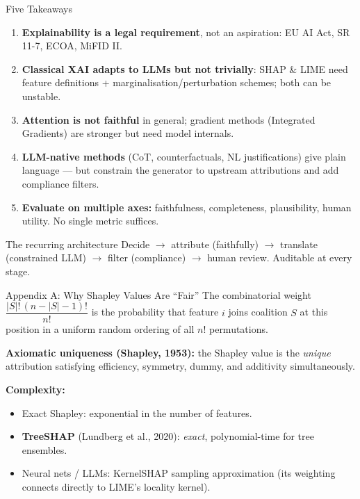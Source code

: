 \documentclass[9pt,t]{beamer}
\begin{document}
\begin{frame}{Five Takeaways}
\begin{enumerate}
  \item \textbf{Explainability is a legal requirement}, not an aspiration:
        EU AI Act, SR 11-7, ECOA, MiFID II.
  \item \textbf{Classical XAI adapts to LLMs but not trivially}: SHAP \& LIME
        need feature definitions + marginalisation/perturbation schemes; both can
        be unstable.
  \item \textbf{Attention is not faithful} in general; gradient methods
        (Integrated Gradients) are stronger but need model internals.
  \item \textbf{LLM-native methods} (CoT, counterfactuals, NL justifications) give
        plain language --- but constrain the generator to upstream attributions
        and add compliance filters.
  \item \textbf{Evaluate on multiple axes:} faithfulness, completeness,
        plausibility, human utility. No single metric suffices.
\end{enumerate}

\medskip
\begin{block}{The recurring architecture}
Decide $\to$ attribute (faithfully) $\to$ translate (constrained LLM) $\to$ filter
(compliance) $\to$ human review. Auditable at every stage.
\end{block}
\end{frame}


\begin{frame}[noframenumbering]{Appendix A: Why Shapley Values Are ``Fair''}
The combinatorial weight $\dfrac{|S|!\,(n-|S|-1)!}{n!}$ is the probability that
feature $i$ joins coalition $S$ at this position in a uniform random ordering of
all $n!$ permutations.

\medskip
\textbf{Axiomatic uniqueness (Shapley, 1953):} the Shapley value is the
\emph{unique} attribution satisfying efficiency, symmetry, dummy, and additivity
simultaneously.

\medskip
\textbf{Complexity:}
\begin{itemize}
  \item Exact Shapley: exponential in the number of features.
  \item \textbf{TreeSHAP} (Lundberg et al., 2020): \emph{exact}, polynomial-time for tree ensembles.
  \item Neural nets / LLMs: KernelSHAP sampling approximation (its weighting
        connects directly to LIME's locality kernel).
\end{itemize}
\end{frame}
\end{document}
